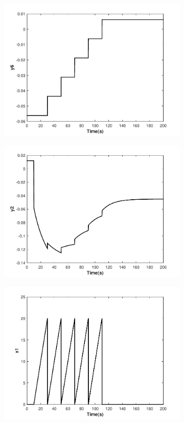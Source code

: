 \documentclass{article}	%
\begin{document}
\begin{figure}[H]
 \begin{subfigure}[b]{0.5\textwidth}
    \includegraphics[width=\textwidth]{y6}
    \end{subfigure}
  \hfill
  \begin{subfigure}[b]{0.5\textwidth}
    \includegraphics[width=\textwidth]{y2}
    \end{subfigure}
    \begin{subfigure}[b]{0.5\textwidth}
    \includegraphics[width=\textwidth]{x1}

\end{subfigure}
\end{figure}
\end{document}
